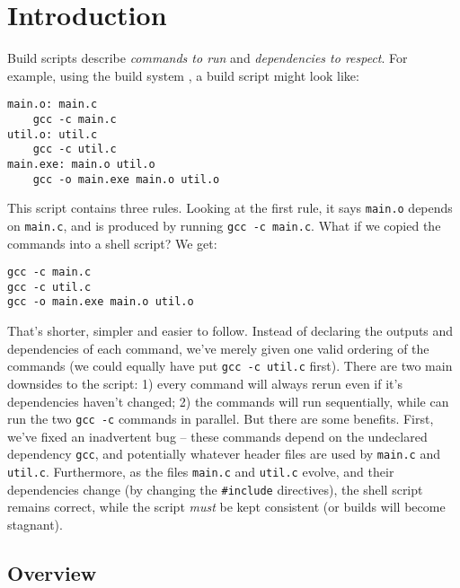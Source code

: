 \section{Introduction}
\label{sec:introduction}

Build scripts \cite{build_systems_a_la_carte} describe \emph{commands to run} and \emph{dependencies to respect}. For example, using the \Make build system \cite{make}, a build script might look like:

\vspace{3mm}
\begin{verbatim}
main.o: main.c
    gcc -c main.c
util.o: util.c
    gcc -c util.c
main.exe: main.o util.o
    gcc -o main.exe main.o util.o
\end{verbatim}
\vspace{3mm}

This script contains three rules. Looking at the first rule, it says \texttt{main.o} depends on \texttt{main.c}, and is produced by running \texttt{gcc -c main.c}. What if we copied the commands into a shell script? We get:

\vspace{3mm}
\begin{verbatim}
gcc -c main.c
gcc -c util.c
gcc -o main.exe main.o util.o
\end{verbatim}
\vspace{3mm}

That's shorter, simpler and easier to follow. Instead of declaring the outputs and dependencies of each command, we've merely given one valid ordering of the commands (we could equally have put \texttt{gcc -c util.c} first). There are two main downsides to the script: 1) every command will always rerun even if it's dependencies haven't changed; 2) the commands will run sequentially, while \Make can run the two \texttt{gcc -c} commands in parallel. But there are some benefits. First, we've fixed an inadvertent bug -- these commands depend on the undeclared dependency \texttt{gcc}, and potentially whatever header files are used by \texttt{main.c} and \texttt{util.c}. Furthermore, as the files \texttt{main.c} and \texttt{util.c} evolve, and their dependencies change (by changing the \texttt{\#include} directives), the shell script remains correct, while the \Make script \emph{must} be kept consistent (or builds will become stagnant).

\subsection{Overview}

